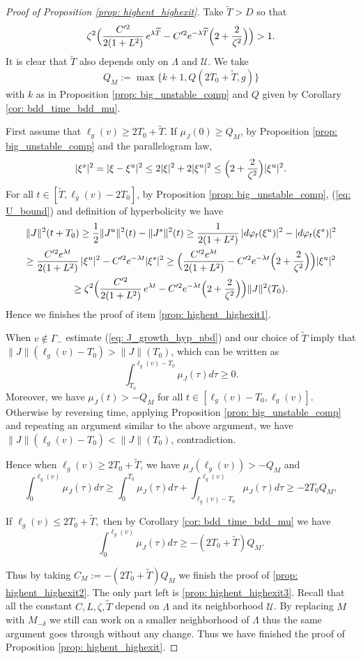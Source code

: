 \documentclass[JEP,XML,SOM,Unicode,NoFloatCountersInSection]{cedram}
\newcommand{\elg}{\ell_g}
\theoremstyle{definition}
\let\phi\varphi
\renewcommand{\>}{{\rangle}}
\newcommand{\<}{{\langle}}
\begin{document}
\begin{proof}[Proof of Proposition \ref{prop: highent_highexit}]
Take $\widetilde{T}>D$ so that
\[
\zeta^2\Bigl( \frac{C'^2}{2(1+L^2)}\,e^{\lambda \widetilde{T}}-C'^2e^{-\lambda \widetilde{T}}\Bigl(2+\frac{2}{\zeta^2}\Bigr) \Bigr)>1.
\]
It is clear that $\widetilde{T}$ also depends only on $\Lambda$ and $\mathcal{U}$. We take
\[
Q_M:=\max\{k+1, Q(2T_0+\widetilde{T},g)\}
\]
with $k$ as in Proposition \ref{prop: big_unstable_comp} and $Q$ given by Corollary \ref{cor: bdd_time_bdd_mu}.

First assume that $\elg(v)\geq 2T_0+\widetilde{T}$. If $\mu_J(0)\geq Q_M$, by Proposition \ref{prop: big_unstable_comp} and the parallelogram law,
\[
|\xi^s|^2=|\xi-\xi^u|^2\leq 2|\xi|^2+2|\xi^u|^2\leq \Bigl(2+\frac{2}{\zeta^2}\Bigr)|\xi^u|^2.
\]
For all $t\in [\widetilde{T},\elg(v)-2T_0]$, by Proposition \ref{prop: big_unstable_comp}, (\ref{eq: U_bound}) and definition of hyperbolicity we have
\begin{multline}\label{eq: J_growth_hyp_nbd}
\|J\|^2(t+T_0)\geq \frac{1}{2}\|J^u\|^2(t)-\|J^s\|^2(t) \geq \frac{1}{2(1+L^2)}\,|d\phi_t(\xi^u)|^2-|d\phi_t(\xi^s)|^2\\
\geq\frac{C'^2e^{\lambda t}}{2(1+L^2)}\,|\xi^u|^2-C'^2e^{-\lambda t}|\xi^s|^2\geq \Bigl( \frac{C'^2e^{\lambda t}}{2(1+L^2)}-C'^2e^{-\lambda t}\Bigl(2+\frac{2}{\zeta^2}\Bigr) \Bigr) |\xi^u|^2\\
\geq \zeta^2\Bigl( \frac{C'^2}{2(1+L^2)}\,e^{\lambda t}-C'^2e^{-\lambda t}\Bigl(2+\frac{2}{\zeta^2}\Bigr) \Bigr) \|J\|^2(T_0).
\end{multline}
Hence we finishes the proof of item \eqref{prop: highent_highexit1}.

When $v\notin\Gamma_-$ estimate (\ref{eq: J_growth_hyp_nbd}) and our choice of $\widetilde{T}$ imply that $\|J\|(\elg(v)-T_0)>\|J\|(T_0)$, which can be written as
\[
\int_{T_0}^{\elg(v)-T_0}\mu_J(\tau)d\tau\geq 0.
\]
Moreover, we have $\mu_{J}(t)>-Q_M$ for all $t\in[\elg(v)-T_0, \elg(v)]$. Otherwise by reversing time, applying Proposition \ref{prop: big_unstable_comp} and repeating an argument similar to the above argument, we have $\|J\|(\elg(v)-T_0)<\|J\|(T_0)$, contradiction.

Hence when $\elg(v)\geq 2T_0+\widetilde{T}$, we have $\mu_J(\elg(v))>-Q_M$ and
\[
\int_0^{\elg(v)} \mu_J(\tau)d\tau \geq \int_0^{T_0} \mu_J(\tau)d\tau+\int_{\elg(v)-T_0}^{\elg(v)} \mu_J(\tau)d\tau\geq -2T_0 Q_M,
\]

If $\elg(v)\leq 2T_0+\widetilde{T},$ then by Corollary \ref{cor: bdd_time_bdd_mu} we have
\[
\int_0^{\elg(v)} \mu_J(\tau)d\tau \geq -(2T_0+\widetilde{T}) Q_M.
\]

Thus by taking $C_M:=-(2T_0+\widetilde{T}) Q_M$ we finish the proof of \eqref{prop: highent_highexit2}. The only part left is \eqref{prop: highent_highexit3}. Recall that all the constant $C, L, \zeta, \widetilde{T}$ depend on $\Lambda$ and its neighborhood $\mathcal U$. By replacing $M$ with $M_{-\delta}$ we still can work on a smaller neighborhood of $\Lambda$ thus the same argument goes through without any change. Thus we have finished the proof of Proposition \ref{prop: highent_highexit}.
\end{proof}
\end{document}
